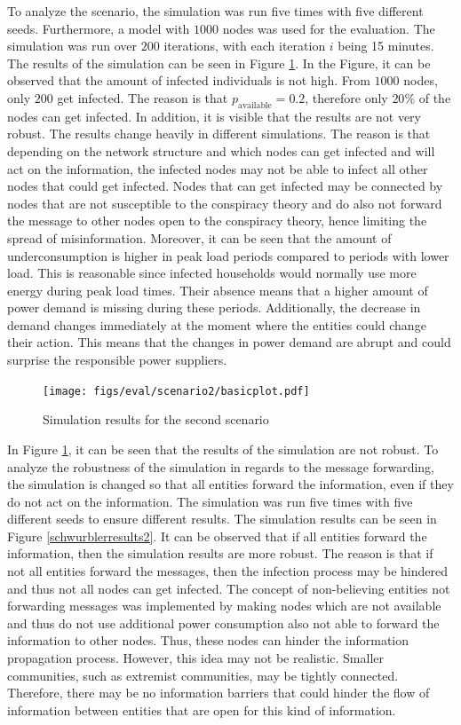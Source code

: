 To analyze the scenario, the simulation was run five times with five 
different seeds. Furthermore, a model with $1000$ nodes was used 
for the evaluation. 
The simulation was run over $200$ iterations, with each
iteration $i$ being 15 minutes.
The results of the simulation can be seen in
Figure \ref{schwurblerresults}. In the Figure, it can be 
observed that the amount of infected individuals is not high.
From $1000$ nodes, only $200$ get infected. The reason is 
that $p_{\mathrm{available}}=0.2$, therefore only $20\%$ of the nodes
can get infected. In addition, it is visible that the results 
are not very robust. The results change heavily in different 
simulations. The reason is that depending on the network structure
and which nodes can get infected and will act on the information, 
the infected nodes may not be able to infect all other nodes
that could get infected. Nodes that can get infected may be 
connected by nodes that are not susceptible to the conspiracy 
theory and do also not forward the message to other nodes
open to the conspiracy theory, hence limiting the 
spread of misinformation.
Moreover, it can be seen that the amount of underconsumption
is higher in peak load periods compared to periods with 
lower load. This is reasonable since infected households would 
normally use more energy during peak load times. Their absence
means that a higher amount of power demand is missing 
during these periods. Additionally, the decrease in demand 
changes immediately at the moment where the entities 
could change their action. This means that the changes 
in power demand are abrupt and could surprise the responsible 
power suppliers.

\begin{figure}[!ht]
    \center
    \texttt{[image: figs/eval/scenario2/basicplot.pdf]}
    \caption{Simulation results for the second scenario}
    \label{schwurblerresults}
\end{figure}

In Figure \ref{schwurblerresults}, it can be seen that 
the results of the simulation are not robust. To analyze the 
robustness of the simulation in regards to the message 
forwarding, the simulation is changed so that all entities
forward the information, even if they do not act on the information. 
The simulation was run five times with five different seeds
to ensure different results. The simulation results can be
seen in Figure \ref{schwurblerresults2}. It
can be observed that if all entities forward 
the information, then the simulation results are more robust. 
The reason is that if not all entities forward the messages,
then the infection process may be hindered and thus not
all nodes can get infected. The concept of non-believing entities
not forwarding messages
was implemented by making nodes which are not available and thus
do not use additional power consumption
also not able to forward the information to other nodes.
Thus, these nodes can hinder the information propagation process.
However, this idea may not be realistic. Smaller communities,
such as extremist communities, may 
be tightly connected. Therefore, there may be no information 
barriers that could hinder the flow of information between 
entities that are open for this kind of information.



